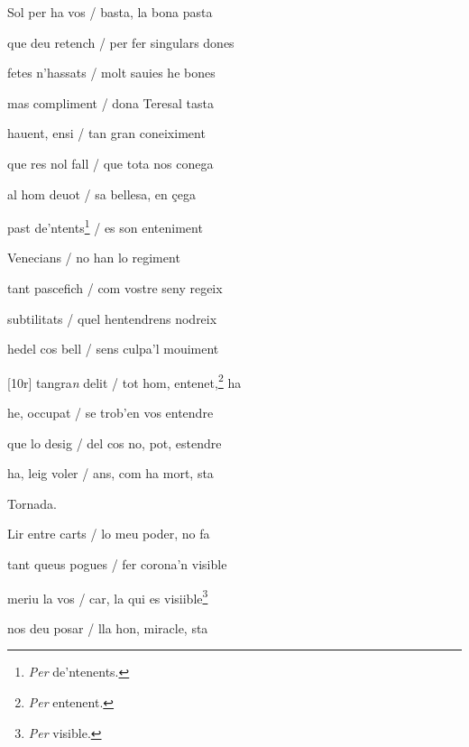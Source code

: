 \documentclass[12pt]{article}
\begin{document}
\begin{estrofa}

 Sol per ha vos / basta, la bona pasta

 que deu retench / per fer singulars dones

 fetes n'hassats / molt sauies he bones

 mas compliment / dona Teresal tasta

 hauent, ensi / tan gran coneiximent

 que res nol fall / que tota nos conega

 al hom deuot / sa bellesa, en \c{c}ega

 past de'ntents\footnote{\textit{Per} de'ntenents.} / es son enteniment

\end{estrofa}



\begin{estrofa}

 Venecians / no han lo regiment

 tant pascefich / com vostre seny regeix

 subtilitats / quel hentendrens nodreix

 hedel cos bell / sens culpa'l mouiment

 [10r] tangra\textit{n} delit / tot hom, entenet,\footnote{\textit{Per}
entenent.} ha

 he, occupat / se trob'en vos entendre

 que lo desig / del cos no, pot, estendre

 ha, leig voler / ans, com ha mort, sta

\end{estrofa}


\begin{estrofaExtra}%




\begin{tornada}

Tornada.

\end{tornada}


\end{estrofaExtra}


\begin{estrofa}

 Lir entre carts / lo meu poder, no fa

 tant queus pogues / fer corona'n visible

 meriu la vos / car, la qui es visiible\footnote{\textit{Per} visible.}

 nos deu posar / lla hon, miracle, sta

\end{estrofa}
\end{document}

